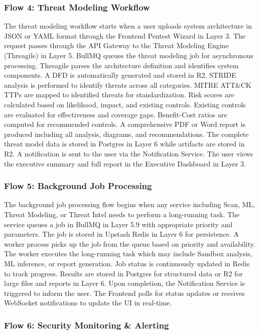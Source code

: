 \documentclass[12pt,a4paper]{report}
\begin{document}
\subsubsection{Flow 4: Threat Modeling Workflow}

The threat modeling workflow starts when a user uploads system architecture in JSON or YAML format through the Frontend Pentest Wizard in Layer 3. The request passes through the API Gateway to the Threat Modeling Engine (Threagile) in Layer 5. BullMQ queues the threat modeling job for asynchronous processing. Threagile parses the architecture definition and identifies system components. A DFD is automatically generated and stored in R2. STRIDE analysis is performed to identify threats across all categories. MITRE ATT\&CK TTPs are mapped to identified threats for standardization. Risk scores are calculated based on likelihood, impact, and existing controls. Existing controls are evaluated for effectiveness and coverage gaps. Benefit-Cost ratios are computed for recommended controls. A comprehensive PDF or Word report is produced including all analysis, diagrams, and recommendations. The complete threat model data is stored in Postgres in Layer 6 while artifacts are stored in R2. A notification is sent to the user via the Notification Service. The user views the executive summary and full report in the Executive Dashboard in Layer 3.

\subsubsection{Flow 5: Background Job Processing}

The background job processing flow begins when any service including Scan, ML, Threat Modeling, or Threat Intel needs to perform a long-running task. The service queues a job in BullMQ in Layer 5.9 with appropriate priority and parameters. The job is stored in Upstash Redis in Layer 6 for persistence. A worker process picks up the job from the queue based on priority and availability. The worker executes the long-running task which may include Sandbox analysis, ML inference, or report generation. Job status is continuously updated in Redis to track progress. Results are stored in Postgres for structured data or R2 for large files and reports in Layer 6. Upon completion, the Notification Service is triggered to inform the user. The Frontend polls for status updates or receives WebSocket notifications to update the UI in real-time.

\subsubsection{Flow 6: Security Monitoring \& Alerting}
\end{document}
